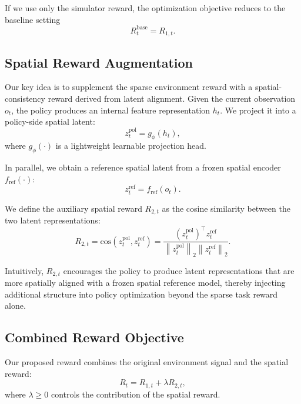 If we use only the simulator reward, the optimization objective reduces to the baseline setting
\begin{equation}
    R^{\text{base}}_t = R_{1,t}.
\end{equation}

\subsection{Spatial Reward Augmentation}

Our key idea is to supplement the sparse environment reward with a spatial-consistency reward derived from latent alignment.
Given the current observation $o_t$, the policy produces an internal feature representation $h_t$.
We project it into a policy-side spatial latent:
\begin{equation}
    z^{\text{pol}}_t = g_\phi(h_t),
\end{equation}
where $g_\phi(\cdot)$ is a lightweight learnable projection head.

In parallel, we obtain a reference spatial latent from a frozen spatial encoder $f_{\text{ref}}(\cdot)$:
\begin{equation}
    z^{\text{ref}}_t = f_{\text{ref}}(o_t).
\end{equation}

We define the auxiliary spatial reward $R_{2,t}$ as the cosine similarity between the two latent representations:
\begin{equation}
    R_{2,t} = \mathrm{cos}\!\left(z^{\text{pol}}_t, z^{\text{ref}}_t\right)
    = \frac{\left(z^{\text{pol}}_t\right)^\top z^{\text{ref}}_t}
    {\left\|z^{\text{pol}}_t\right\|_2 \left\|z^{\text{ref}}_t\right\|_2}.
\end{equation}

Intuitively, $R_{2,t}$ encourages the policy to produce latent representations that are more spatially aligned with a frozen spatial reference model, thereby injecting additional structure into policy optimization beyond the sparse task reward alone.

\subsection{Combined Reward Objective}

Our proposed reward combines the original environment signal and the spatial reward:
\begin{equation}
    R_t = R_{1,t} + \lambda R_{2,t},
\end{equation}
where $\lambda \ge 0$ controls the contribution of the spatial reward.

